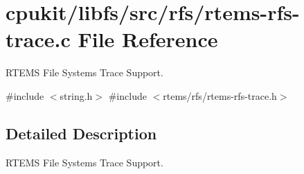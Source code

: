\hypertarget{rtems-rfs-trace_8c}{}\section{cpukit/libfs/src/rfs/rtems-\/rfs-\/trace.c File Reference}
\label{rtems-rfs-trace_8c}


R\+T\+E\+MS File Systems Trace Support.  


{\ttfamily \#include $<$string.\+h$>$}\newline
{\ttfamily \#include $<$rtems/rfs/rtems-\/rfs-\/trace.\+h$>$}\newline


\subsection{Detailed Description}
R\+T\+E\+MS File Systems Trace Support. 

